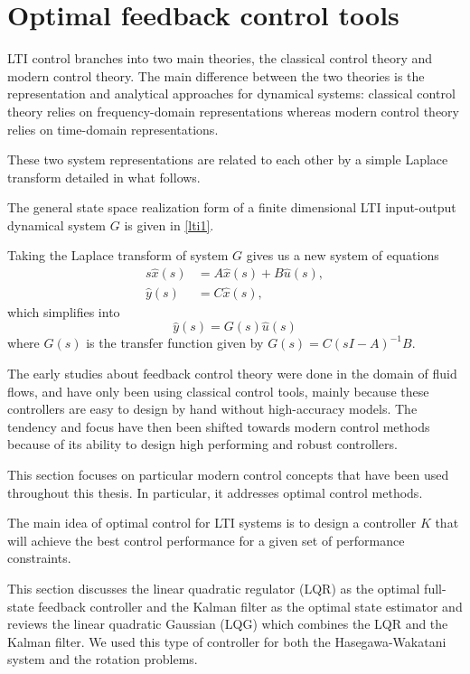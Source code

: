 \documentclass[12pt,lot, lof]{puthesis}
\begin{document}
\section{Optimal feedback control tools}
\label{optfed}

LTI control branches into two main theories, the classical control theory and modern control theory. The main difference between the two theories is the representation and analytical approaches for dynamical systems: classical control theory relies on frequency-domain representations whereas modern control theory relies on time-domain representations.
 
 These two system representations are related to each other by a simple Laplace transform detailed in what follows.

The general state space realization form of a finite dimensional LTI input-output dynamical system $G$ is given in \eqref{lti1}.

Taking the Laplace transform of system $G$ gives us a new system of equations
\begin{equation}
\label{lti2}
\begin{aligned}
	s \hat{x}(s) &= A \hat{x}(s) + B \hat{u}(s),   \\
	\hat{y}(s) &= C \hat{x}(s),
\end{aligned}
\end{equation}
which simplifies into 
%
\begin{equation}
\label{lti3}
\hat{y}(s) = G(s) \hat{u}(s) 
\end{equation}
where $G(s)$ is the transfer function given by $G(s) = C (sI - A)^{-1} B $.

The early studies about feedback control theory were done in the domain of fluid flows, and have only been using classical control tools, mainly because these controllers are easy to design by hand without high-accuracy models. The tendency and focus have then been shifted towards modern control methods because of its ability to design high performing and robust controllers.

This section focuses on particular modern control concepts that have been used throughout this thesis. In particular, it addresses optimal control methods. 

The main idea of optimal control for LTI systems is to design a controller $K$ that will achieve the best control performance for a given set of performance constraints.

This section discusses the linear quadratic regulator (LQR) as the optimal full-state feedback controller and the Kalman filter as the optimal state estimator and reviews the linear quadratic Gaussian (LQG) which combines the LQR and the Kalman filter. We used this type of controller for both the Hasegawa-Wakatani system and the rotation problems.
\end{document}
